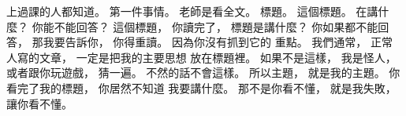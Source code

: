 \hypertarget{w01:cue:2684}{}上過課的人都知道。
\hypertarget{w01:cue:2685}{}第一件事情。
\hypertarget{w01:cue:2686}{}老師是看全文。
\hypertarget{w01:cue:2687}{}標題。
\hypertarget{w01:cue:2688}{}這個標題。
\hypertarget{w01:cue:2689}{}在講什麼？
\hypertarget{w01:cue:2690}{}你能不能回答？
\hypertarget{w01:cue:2691}{}這個標題，
\hypertarget{w01:cue:2692}{}你讀完了，
\hypertarget{w01:cue:2693}{}標題是講什麼？
\hypertarget{w01:cue:2694}{}你如果都不能回答，
\hypertarget{w01:cue:2695}{}那我要告訴你，
\hypertarget{w01:cue:2696}{}你得重讀。
\hypertarget{w01:cue:2697}{}因為你沒有抓到它的
\hypertarget{w01:cue:2698}{}重點。
\hypertarget{w01:cue:2699}{}我們通常，
\hypertarget{w01:cue:2700}{}正常人寫的文章，
\hypertarget{w01:cue:2701}{}一定是把我的主要思想
\hypertarget{w01:cue:2702}{}放在標題裡。
\hypertarget{w01:cue:2703}{}如果不是這樣，
\hypertarget{w01:cue:2704}{}我是怪人，
\hypertarget{w01:cue:2705}{}或者跟你玩遊戲，
\hypertarget{w01:cue:2706}{}猜一遍。
\hypertarget{w01:cue:2707}{}不然的話不會這樣。
\hypertarget{w01:cue:2708}{}所以主題，
\hypertarget{w01:cue:2709}{}就是我的主題。
\hypertarget{w01:cue:2710}{}你看完了我的標題，
\hypertarget{w01:cue:2711}{}你居然不知道
\hypertarget{w01:cue:2712}{}我要講什麼。
\hypertarget{w01:cue:2713}{}那不是你看不懂，
\hypertarget{w01:cue:2714}{}就是我失敗，
\hypertarget{w01:cue:2715}{}讓你看不懂。

